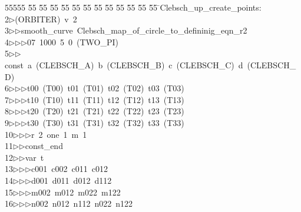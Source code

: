 %
%
\begin{tabbing}
55555 \= 55 \= 55 \= 55 \= 55 \= 55 \= 55 \= 55 \= 55 \= 55 \= 55 \= 55 \= 55 \= \>Clebsch\_up\_create\_points:\\[0pt]
2\>$\triangleright$\>(ORBITER)\ v\ 2\ \\[0pt]
3\>$\triangleright$\>$\triangleright$\>smooth\_curve\ Clebsch\_map\_of\_circle\_to\_defininig\_eqn\_r2\ \\[0pt]
4\>$\triangleright$\>$\triangleright$\>$\triangleright$07\ 1000\ 5\ 0\ (TWO\_PI)\ \\[0pt]
5\>$\triangleright$\>$\triangleright$\>const\ a\ (CLEBSCH\_A)\ b\ (CLEBSCH\_B)\ c\ (CLEBSCH\_C)\ d\ (CLEBSCH\_D)\ \\[0pt]
6\>$\triangleright$\>$\triangleright$\>$\triangleright$\>t00\ (T00)\ t01\ (T01)\ t02\ (T02)\ t03\ (T03)\ \\[0pt]
7\>$\triangleright$\>$\triangleright$\>$\triangleright$\>t10\ (T10)\ t11\ (T11)\ t12\ (T12)\ t13\ (T13)\ \\[0pt]
8\>$\triangleright$\>$\triangleright$\>$\triangleright$\>t20\ (T20)\ t21\ (T21)\ t22\ (T22)\ t23\ (T23)\ \\[0pt]
9\>$\triangleright$\>$\triangleright$\>$\triangleright$\>t30\ (T30)\ t31\ (T31)\ t32\ (T32)\ t33\ (T33)\ \\[0pt]
10\>$\triangleright$\>$\triangleright$\>$\triangleright$\>r\ 2\ one\ 1\ m\ 1\ \\[0pt]
11\>$\triangleright$\>$\triangleright$\>const\_end\ \\[0pt]
12\>$\triangleright$\>$\triangleright$\>var\ t\ \\[0pt]
13\>$\triangleright$\>$\triangleright$\>$\triangleright$\>c001\ c002\ c011\ c012\ \\[0pt]
14\>$\triangleright$\>$\triangleright$\>$\triangleright$\>d001\ d011\ d012\ d112\ \\[0pt]
15\>$\triangleright$\>$\triangleright$\>$\triangleright$\>m002\ m012\ m022\ m122\ \\[0pt]
16\>$\triangleright$\>$\triangleright$\>$\triangleright$\>n002\ n012\ n112\ n022\ n122\ \\[0pt]

\end{tabbing}
